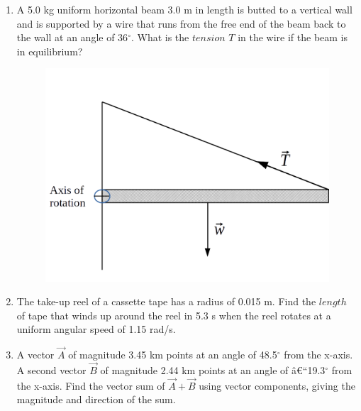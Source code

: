 \documentclass[12pt, a4paper/letterpaper]{report}
\begin{document}
\begin{enumerate}[leftmargin=\labelsep]
\vspace{10mm}

\item
A 5.0 kg uniform horizontal beam 3.0 m in length is butted to a vertical wall and is supported by a wire that runs from the free end of the beam back to the wall at an angle of 36$^{\circ}$. What is the $tension$ $T$ in the wire if the beam is in equilibrium? \\  \begin{figure}[h] \begin{center} \includegraphics[scale=0.32] {pdb-25.png} \end{center} \end{figure}

\vspace{10mm}

\item
The take-up reel of a cassette tape has a radius of 0.015 m. Find the $length$ of tape that winds up around the reel in 5.3 s when the reel rotates at a uniform angular speed of 1.15 rad/s.

\vspace{10mm}

\item
A vector $\vec{A}$ of magnitude 3.45 km points at an angle of 48.5$^{\circ}$ from the x-axis. A second vector $\vec{B}$ of magnitude 2.44 km points at an angle of â€“19.3$^{\circ}$ from the x-axis. Find the vector sum of $\vec{A}+\vec{B}$ using vector components, giving the magnitude and direction of the sum.

\vspace{10mm}

\end{enumerate}
\end{document}
